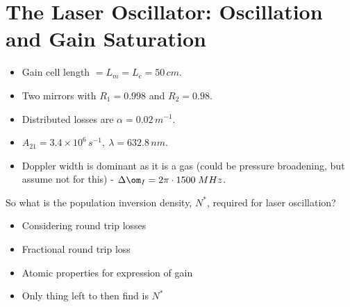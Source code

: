 \documentclass[a4paper, 11pt, normalem]{report}
\begin{document}
\chapter{The Laser Oscillator: Oscillation and Gain Saturation}
\begin{example}
    \begin{itemize}
        \item Gain cell length $= L_m = L_c = 50\,cm$.
        \item Two mirrors with $R_1 = 0.998$ and $R_2 = 0.98$.
        \item Distributed losses are $\alpha = 0.02\,m^{-1}$.
        \item $A_{21} = 3.4\times10^6\,s^{-1},~ \lambda = 632.8\,nm$.
        \item Doppler width is dominant as it is a gas (could be pressure broadening, but assume not for this) - $\Delta\om_I = 2\pi\cdot1500\;MHz$.
    \end{itemize}
    So what is the population inversion density, $N^*$, required for laser oscillation?
    \begin{itemize}
        \item Considering round trip losses
        \item Fractional round trip loss
        \item Atomic properties for expression of gain
        \item Only thing left to then find is $N^*$
    \end{itemize}
\end{example}
\end{document}
